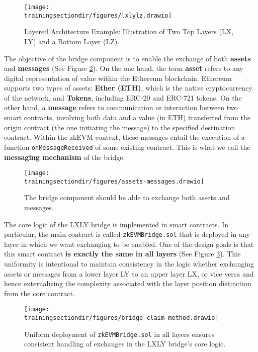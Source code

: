 \begin{figure}[H]
\centering
\texttt{[image: \\trainingsectiondir/figures/lxlylz.drawio]}
\caption{Layered Architecture Example: Illustration of Two Top Layers (LX, LY) and a Bottom Layer (LZ).}
\label{fig:lxlylz}
\end{figure}

The objective of the bridge component is to enable the exchange of both \textbf{assets} and \textbf{messages} (See Figure \ref{fig:assets-messages}). On the one hand, the term \textbf{asset} refers to any digital representation of value within the Ethereum blockchain. Ethereum supports two types of assets: \textbf{Ether (ETH)}, which is the native cryptocurrency of the network, and \textbf{Tokens}, including ERC-20 and ERC-721 tokens. On the other hand, a \textbf{message} refers to communication or interaction between two smart contracts, involving both data and a value (in ETH) transferred from the origin contract (the one initiating the message) to the specified destination contract. Within the zkEVM context, these messages entail the execution of a function \texttt{onMessageReceived} of some existing contract. This is what we call the \textbf{messaging mechanism} of the bridge.

\vspace{1em}

\begin{figure}[H]
\centering
\texttt{[image: \\trainingsectiondir/figures/assets-messages.drawio]}
\caption{The bridge component should be able to exchange both assets and messages.}
\label{fig:assets-messages}
\end{figure}

The core logic of the LXLY bridge is implemented in smart contracts. In particular, the main contract is called \texttt{zkEVMBridge.sol} that is deployed in any layer in which we want exchanging to be enabled. One of the design goals is that this smart contract \textbf{is exactly the same in all layers} (See Figure \ref{fig:bridge-claim-method}). This uniformity is intentional to maintain consistency in the logic whether exchanging assets or messages from a lower layer LY to an upper layer LX, or vice versa and hence externalizing the complexity associated with the layer position distinction from the core contract.

\vspace{1em}

\begin{figure}[H]
\centering
\texttt{[image: \\trainingsectiondir/figures/bridge-claim-method.drawio]}
\caption{Uniform deployment of \texttt{zkEVMBridge.sol} in all layers ensures consistent handling of exchanges in the LXLY bridge's core logic.}
\label{fig:bridge-claim-method}
\end{figure}

